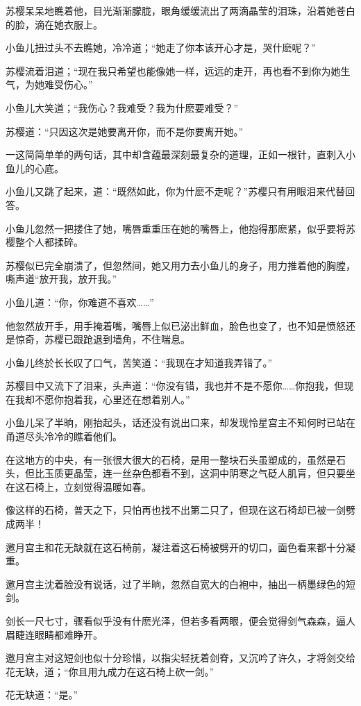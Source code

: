 \documentclass[12pt,oneside]{book}
\begin{document}
苏樱呆呆地瞧着他，目光渐渐朦胧，眼角缓缓流出了两滴晶莹的泪珠，沿着她苍白的脸，滴在她衣服上。

小鱼儿扭过头不去瞧她，冷冷道；``她走了你本该开心才是，哭什麽呢？''

苏樱流着泪道；``现在我只希望也能像她一样，远远的走开，再也看不到你为她生气，为她难受伤心。''

小鱼儿大笑道；``我伤心？我难受？我为什麽要难受？''

苏樱道：``只因这次是她要离开你，而不是你要离开她。''

一这简简单单的两句话，其中却含蕴最深刻最复杂的道理，正如一根针，直刺入小鱼儿的心底。

小鱼儿又跳了起来，道：``既然如此，你为什麽不走呢？''苏樱只有用眼泪来代替回答。

小鱼儿忽然一把搂住了她，嘴唇重重压在她的嘴唇上，他抱得那麽紧，似乎要将苏樱整个人都揉碎。

苏樱似已完全崩溃了，但忽然间，她又用力去小鱼儿的身子，用力推着他的胸膛，嘶声道``放开我，放开我。''

小鱼儿道：``你，你难道不喜欢\ldots\ldots{}''

他忽然放开手，用手掩着嘴，嘴唇上似已泌出鲜血，脸色也变了，也不知是愤怒还是惊奇，苏樱已跟跄退到墙角，不住喘息。

小鱼儿终於长长叹了口气，苦笑道：``我现在才知道我弄错了。''

苏樱目中又流下了泪来，头声道：``你没有错，我也并不是不愿你\ldots\ldots 你抱我，但现在我却不愿你抱着我，心里还在想着别人。''

小鱼儿呆了半晌，刚抬起头，话还没有说出口来，却发现怜星宫主不知何时已站在甬道尽头冷冷的瞧着他们。

在这地方的中央，有一张很大很大的石椅，是用一整块石头虽塑成的，虽然是石头，但比玉质更晶莹，连一丝杂色都看不到，这洞中阴寒之气砭人肌肓，但只要坐在这石椅上，立刻觉得温暖如春。

像这样的石椅，普天之下，只怕再也找不出第二只了，但现在这石椅却已被一剑劈成两半！

邀月宫主和花无缺就在这石椅前，凝注着这石椅被劈开的切口，面色看来都十分凝重。

邀月宫主沈着脸没有说话，过了半晌，忽然自宽大的白袍中，抽出一柄墨绿色的短剑。

剑长一尺七寸，骤看似乎没有什麽光泽，但若多看两眼，便会觉得剑气森森，逼人眉睫连眼睛都难睁开。

邀月宫主对这短剑也似十分珍惜，以指尖轻抚着剑脊，又沉吟了许久，才将剑交给花无缺，道；``你且用九成力在这石椅上砍一剑。''

花无缺道：``是。''
\end{document}
